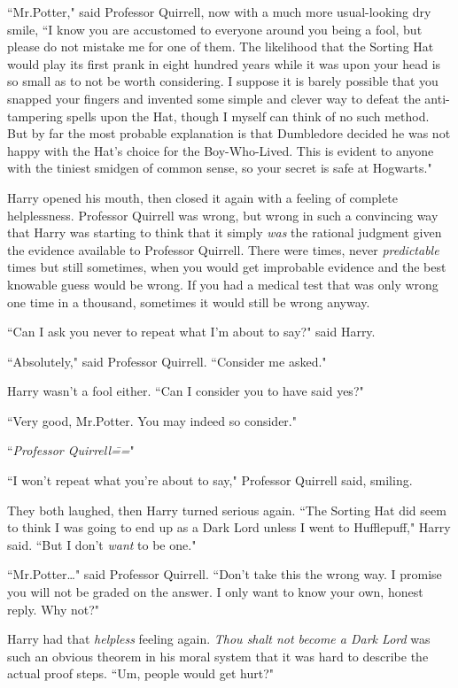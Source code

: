 ``Mr.\?Potter," said Professor Quirrell, now with a much more usual-looking dry smile, ``I know you are accustomed to everyone around you being a fool, but please do not mistake me for one of them. The likelihood that the Sorting Hat would play its first prank in eight hundred years while it was upon your head is so small as to not be worth considering. I suppose it is barely possible that you snapped your fingers and invented some simple and clever way to defeat the anti-tampering spells upon the Hat, though I myself can think of no such method. But by far the most probable explanation is that Dumbledore decided he was not happy with the Hat's choice for the Boy-Who-Lived. This is evident to anyone with the tiniest smidgen of common sense, so your secret is safe at Hogwarts."

Harry opened his mouth, then closed it again with a feeling of complete helplessness. Professor Quirrell was wrong, but wrong in such a convincing way that Harry was starting to think that it simply \emph{was} the rational judgment given the evidence available to Professor Quirrell. There were times, never \emph{predictable} times but still sometimes, when you would get improbable evidence and the best knowable guess would be wrong. If you had a medical test that was only wrong one time in a thousand, sometimes it would still be wrong anyway.

``Can I ask you never to repeat what I'm about to say?" said Harry.

``Absolutely," said Professor Quirrell. ``Consider me asked."

Harry wasn't a fool either. ``Can I consider you to have said yes?"

``Very good, Mr.\?Potter. You may indeed so consider."

``\emph{Professor Quirrell\===}"

``I won't repeat what you're about to say," Professor Quirrell said, smiling.

They both laughed, then Harry turned serious again. ``The Sorting Hat did seem to think I was going to end up as a Dark Lord unless I went to Hufflepuff," Harry said. ``But I don't \emph{want} to be one."

``Mr.\?Potter{\ldots}" said Professor Quirrell. ``Don't take this the wrong way. I promise you will not be graded on the answer. I only want to know your own, honest reply. Why not?"

Harry had that \emph{helpless} feeling again. \emph{Thou shalt not become a Dark Lord} was such an obvious theorem in his moral system that it was hard to describe the actual proof steps. ``Um, people would get hurt?"

